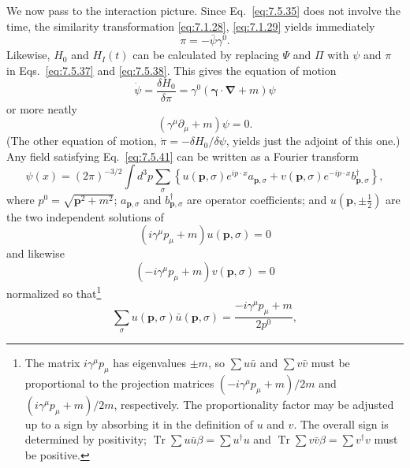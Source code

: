 We now pass to the interaction picture. Since Eq.~\eqref{eq:7.5.35} does not involve
the time, the similarity transformation \eqref{eq:7.1.28}, \eqref{eq:7.1.29} yields immediately
\begin{equation}
\pi=-\bar\psi\gamma^0.
\tag{7.5.39}\label{eq:7.5.39}
\end{equation}
Likewise, $H_0$ and $H_I(t)$ can be calculated by replacing $\Psi$ and $\Pi$
with $\psi$ and $\pi$ in Eqs.~\eqref{eq:7.5.37} and \eqref{eq:7.5.38}. This gives the equation
of motion
\begin{equation}
\dot\psi=\frac{\delta H_0}{\delta\pi}
=\gamma^0(\boldsymbol\gamma\cdot\boldsymbol\nabla+m)\psi
\tag{7.5.40}\label{eq:7.5.40}
\end{equation}
or more neatly
\begin{equation}
(\gamma^\mu\partial_\mu+m)\psi=0.
\tag{7.5.41}\label{eq:7.5.41}
\end{equation}
(The other equation of motion, $\dot\pi=-\delta H_0/\delta\psi$, yields just
the adjoint of this one.) Any field satisfying Eq.~\eqref{eq:7.5.41} can be written as
a Fourier transform
\begin{equation}
\psi(x)=(2\pi)^{-3/2}\int d^3p\sum_\sigma
\left\{u(\mathbf p,\sigma)e^{ip\cdot x}a_{\mathbf p,\sigma}
+v(\mathbf p,\sigma)e^{-ip\cdot x}b^\dagger_{\mathbf p,\sigma}\right\},
\tag{7.5.42}\label{eq:7.5.42}
\end{equation}
where $p^0=\sqrt{\mathbf p^2+m^2}$; $a_{\mathbf p,\sigma}$ and
$b^\dagger_{\mathbf p,\sigma}$ are operator coefficients; and
$u(\mathbf p,\mathord\pm\frac12)$ are the two independent solutions of
\begin{equation}
(i\gamma^\mu p_\mu+m)u(\mathbf p,\sigma)=0
\tag{7.5.43}\label{eq:7.5.43}
\end{equation}
and likewise
\begin{equation}
(-i\gamma^\mu p_\mu+m)v(\mathbf p,\sigma)=0
\tag{7.5.44}\label{eq:7.5.44}
\end{equation}
normalized so that\footnote{The matrix $i\gamma^\mu p_\mu$ has eigenvalues
$\pm m$, so $\sum u\bar u$ and $\sum v\bar v$ must be proportional to the
projection matrices $(-i\gamma^\mu p_\mu+m)/2m$ and
$(i\gamma^\mu p_\mu+m)/2m$, respectively. The proportionality factor may be
adjusted up to a sign by absorbing it in the definition of $u$ and $v$. The
overall sign is determined by positivity; $\operatorname{Tr}\sum u\bar u\beta
=\sum u^\dagger u$ and $\operatorname{Tr}\sum v\bar v\beta
=\sum v^\dagger v$ must be positive.}
\begin{equation}
\sum_\sigma u(\mathbf p,\sigma)\bar u(\mathbf p,\sigma)
=\frac{-i\gamma^\mu p_\mu+m}{2p^0},
\tag{7.5.45}\label{eq:7.5.45}
\end{equation}

